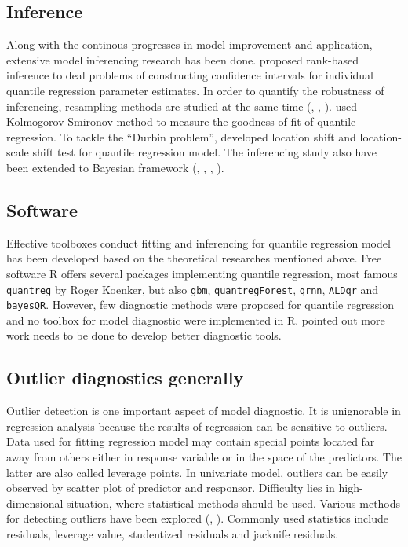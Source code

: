 \documentclass[article]{jss}
\theoremstyle{definition}
\theoremstyle{definition}
\theoremstyle{remark}
\begin{document}
\subsection{Inference}\label{inference}

Along with the continous progresses in model improvement and
application, extensive model inferencing research has been done.
\citet{gutenbrunner1993tests} proposed rank-based inference to deal
problems of constructing confidence intervals for individual quantile
regression parameter estimates. In order to quantify the robustness of
inferencing, resampling methods are studied at the same time
(\citet{hahn1995bootstrapping}, \citet{buchinsky1995estimating},
\citet{feng2011wild}). \citet{koenker1999goodness} used
Kolmogorov-Smironov method to measure the goodness of fit of quantile
regression. To tackle the ``Durbin problem'',
\citet{koenker2002inference} developed location shift and location-scale
shift test for quantile regression model. The inferencing study also
have been extended to Bayesian framework (\citet{yu2001bayesian},
\citet{yu2007bayesian}, \citet{kozumi2011gibbs},
\citet{santos2016bayesian}).

\subsection{Software}\label{software}

Effective toolboxes conduct fitting and inferencing for quantile
regression model has been developed based on the theoretical researches
mentioned above. Free software R offers several packages implementing
quantile regression, most famous \texttt{quantreg} by Roger Koenker, but
also \texttt{gbm}, \texttt{quantregForest}, \texttt{qrnn},
\texttt{ALDqr} and \texttt{bayesQR}. However, few diagnostic methods
were proposed for quantile regression and no toolbox for model
diagnostic were implemented in R. \citet{gu2017unobserved} pointed out
more work needs to be done to develop better diagnostic tools.

\subsection{Outlier diagnostics
generally}\label{outlier-diagnostics-generally}

Outlier detection is one important aspect of model diagnostic. It is
unignorable in regression analysis because the results of regression can
be sensitive to outliers. Data used for fitting regression model may
contain special points located far away from others either in response
variable or in the space of the predictors. The latter are also called
leverage points. In univariate model, outliers can be easily observed by
scatter plot of predictor and responsor. Difficulty lies in
high-dimensional situation, where statistical methods should be used.
Various methods for detecting outliers have been explored
(\citet{rousseeuw1990unmasking}, \citet{gather1997convergence}).
Commonly used statistics include residuals, leverage value, studentized
residuals and jacknife residuals.
\end{document}
